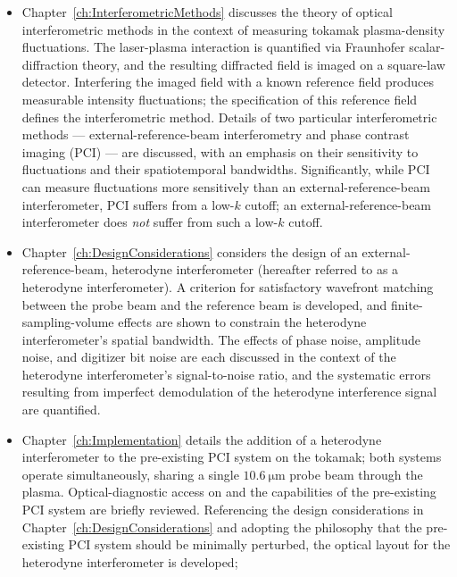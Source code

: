 \begin{itemize}
  \item Chapter~\ref{ch:InterferometricMethods} discusses
    the theory of optical interferometric methods
    in the context of measuring tokamak plasma-density fluctuations.
    The laser-plasma interaction is quantified via
    Fraunhofer scalar-diffraction theory, and
    the resulting diffracted field is imaged on a square-law detector.
    Interfering the imaged field with a known reference field
    produces measurable intensity fluctuations;
    the specification of this reference field
    defines the interferometric method.
    Details of two particular interferometric methods ---
    external-reference-beam interferometry and
    phase contrast imaging (PCI) ---
    are discussed, with an emphasis on
    their sensitivity to fluctuations and their spatiotemporal bandwidths.
    Significantly, while PCI can measure fluctuations more sensitively
    than an external-reference-beam interferometer,
    PCI suffers from a low-$k$ cutoff;
    an external-reference-beam interferometer
    does \emph{not} suffer from such a low-$k$ cutoff.
  \item Chapter~\ref{ch:DesignConsiderations} considers the design of an
    external-reference-beam, heterodyne interferometer
    (hereafter referred to as a heterodyne interferometer).
    A criterion for satisfactory wavefront matching
    between the probe beam and the reference beam is developed, and
    finite-sampling-volume effects are shown
    to constrain the heterodyne interferometer's spatial bandwidth.
    The effects of phase noise, amplitude noise, and digitizer bit noise
    are each discussed in the context of
    the heterodyne interferometer's signal-to-noise ratio, and
    the systematic errors resulting from
    imperfect demodulation of the heterodyne interference signal
    are quantified.
  \item Chapter~\ref{ch:Implementation} details
    the addition of a heterodyne interferometer
    to the pre-existing PCI system on the \diiid\space tokamak;
    both systems operate simultaneously,
    sharing a single $\SI{10.6}{\micro\meter}$ probe beam through the plasma.
    Optical-diagnostic access on \diiid\space and the capabilities
    of the pre-existing PCI system are briefly reviewed.
    Referencing the design considerations
    in Chapter~\ref{ch:DesignConsiderations} and
    adopting the philosophy
    that the pre-existing PCI system should be minimally perturbed,
    the optical layout for the heterodyne interferometer is developed;

\end{itemize}
